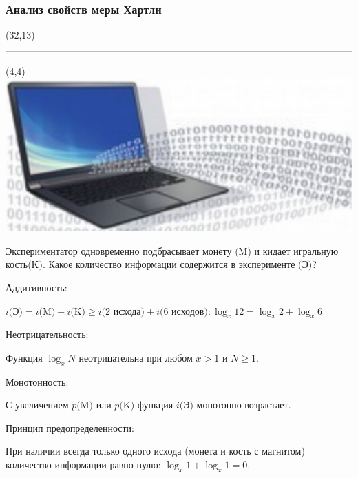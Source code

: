 \documentclass[aspectratio=169, 11pt]{beamer}
\begin{document}
	
	\begin{frame}
		\frametitle{\textbf{\textcolor[rgb]{0.4,0.4,0.4}{\textcolor[rgb]{0,0,1}{А}нализ свойств меры Хартли}}}
		
		\begin{textblock}{50}(32,13)
			\includegraphics[scale=0.4]{Screenshot_1.png}
		\end{textblock}
		
		\begin{textblock}{50}(4,4)
			\includegraphics[scale=0.25]{Screenshot_2.png}
		\end{textblock}
	
		Экспериментатор одновременно подбрасывает монету $ ( $M$ ) $ и кидает игральную кость$ ( $K$ ) $. Какое количество информации содержится в эксперименте $ ( $Э$ ) $?
		\vspace{4 mm}
		
		\textcolor[rgb]{0,0.64,0.09}{Аддитивность}:
		
		\qquad $i($Э$)  = i($M$)  + i($K$) \geq i($2 исхода$) + i($6 исходов$): \log_x 12 = \log_x 2 + \log_x 6$
		
		\vspace{2mm}
		\textcolor[rgb]{0,0.64,0.09}{Неотрицательность}:
		
		\qquad Функция $\log_x N$ неотрицательна при любом $x > 1$ и $N \geq 1.$
		\vspace{2 mm}
		
		\textcolor[rgb]{0,0.64,0.09}{Монотонность}:
		
		\qquad С увеличением $p($M$)$ или $p($K$)$ функция $i($Э$)$ монотонно возрастает.
		\vspace{2 mm}
		
		\textcolor[rgb]{0,0.64,0.09}{Принцип предопределенности}:
		
		\qquad При наличии всегда только одного исхода (монета и кость с магнитом) количество информации равно нулю: $\log_x 1 + \log_x 1 = 0.$
	\end{frame}
\end{document}
